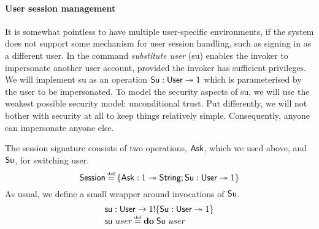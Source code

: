 \documentclass[12pt,phd,lfcs,twoside,openright,logo,leftchapter,normalheadings]{infthesis}
\theoremstyle{plain}
\theoremstyle{definition}
\begin{document}
\paragraph{User session management}
%
It is somewhat pointless to have multiple user-specific environments,
if the system does not support some mechanism for user session
handling, such as signing in as a different user.
%
In \UNIX{} the command \emph{substitute user} (su) enables the invoker
to impersonate another user account, provided the invoker has
sufficient privileges.
%
We will implement su as an operation $\mathsf{Su} : \mathsf{User} \twoheadrightarrow 1$
which is parameterised by the user to be impersonated.
%
To model the security aspects of su, we will use the weakest possible
security model: unconditional trust. Put differently, we will not
bother with security at all to keep things relatively simple.
%
Consequently, anyone can impersonate anyone else.

The session signature consists of two operations, $\mathsf{Ask}$, which we
used above, and $\mathsf{Su}$, for switching user.
%
\[
  \EnvE \defas \{\Ask : \UnitType \opto \String;\Su : \User \opto \UnitType\}
\]
%
As usual, we define a small wrapper around invocations of $\mathsf{Su}$.
%
\[
  \bl
    \su : \User \to \UnitType \eff \{\Su : \User \opto \UnitType\}\\
    \su~user \defas \Do\;\Su~user
  \el
\]
%
\end{document}
